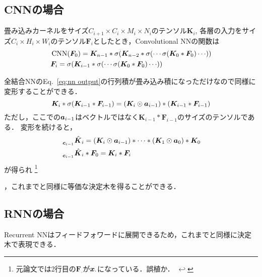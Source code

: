 \documentclass[dvipdfmx,autodetect-engine,12pt,fleqn]{jsarticle}
\DeclareMathOperator{\CNN}{CNN}
\newcounter{footnote-anchor}
\newcommand{\footnoteanchor}[1]{
    \hypertarget{footnote-anchor\arabic{footnote-anchor}}{}%
    \footnote{#1 \hyperlink{footnote-anchor\arabic{footnote-anchor}}{$\hookleftarrow$}}%
    \addtocounter{footnote-anchor}{1}
}
\begin{document}
\subsection{CNNの場合}

\newcommand{\kerneltensor}[1]{\bm{K}_{#1}}
\newcommand{\layertensor}[1]{\bm{F}_{#1}}
畳み込みカーネルをサイズ$C_{i+1}\times C_i\times M_i \times N_i$のテンソル$\kerneltensor{i}$, 各層の入力をサイズ$C_i\times H_i\times W_i$のテンソル$\layertensor{i}$としたとき，Convolutional NNの関数は
\begin{equation}
\begin{split}
&\CNN(\layertensor{0})=\kerneltensor{n-1}*\activation{\kerneltensor{n-2}*\activation{\cdots \activation{\kerneltensor{0}*\layertensor{0}}\cdots}}\\
&\layertensor{i}=\activation{\kerneltensor{i-1}*\activation{\cdots \activation{\kerneltensor{0}*\layertensor{0}}\cdots}}
\end{split}
\end{equation}

全結合NNのEq.~\eqref{eq:nn output}の行列積が畳み込み積になっただけなので同様に変形することができる．
\begin{equation}
\kerneltensor{i}*\activation{\kerneltensor{i-1}*\layertensor{i-1}}
=\qty(\kerneltensor{i}\odot\activeindex{i-1})*(\kerneltensor{i-1}*\layertensor{i-1})
\end{equation}
ただし，ここでの$\bm{a}_{i-1}$はベクトルではなく$\kerneltensor{i-1}*\layertensor{i-1}$のサイズのテンソルである．
変形を続けると，
\newcommand{\effweighttensor}[2]{\prescript{}{#1}{\hat{\bm{K}}}_{#2}}
\begin{equation}
\begin{split}
&\effweighttensor{\catindex{i-1}}{i}=\qty(\kerneltensor{i}\odot\activeindex{i-1})*\cdots*\qty(\kerneltensor{1}\odot\activeindex{0})*\kerneltensor{0}\\
&\effweighttensor{\catindex{i-1}}{i}*\layertensor{0}=\kerneltensor{i}*\layertensor{i}
\end{split}
\end{equation}
が得られ\footnoteanchor{元論文では2行目の$\layertensor{\cdot}$が$\bm{x}_{\cdot}$になっている．誤植か．}，これまでと同様に等価な決定木を得ることができる．

\subsection{RNNの場合}

Recurrent NNはフィードフォワードに展開できるため，これまでと同様に決定木で表現できる．
\end{document}
